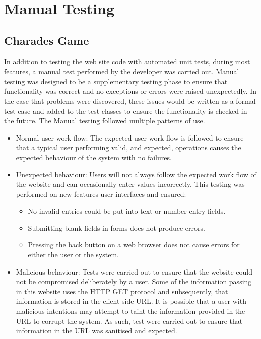 \section{Manual Testing}
\subsection{Charades Game}
In addition to testing the web site code with automated unit tests, during most features, a manual test performed by the developer was carried out. Manual testing was designed to be a supplementary testing phase to ensure that functionality was correct and no exceptions or errors were raised unexpectedly. In the case that problems were discovered, these issues would be written as a formal test case and added to the test classes to ensure the functionality is checked in the future. The Manual testing followed multiple patterns of use.
\begin{itemize}
	\item Normal user work flow: The expected user work flow is followed to ensure that a typical user performing valid, and expected, operations causes the expected behaviour of the system with no failures.
	
	\item Unexpected behaviour: Users will not always follow the expected work flow of the website and can occasionally enter values incorrectly. This testing was performed on new features user interfaces and ensured:
	\begin{itemize}
		\item No invalid entries could be put into text or number entry fields.
		\item Submitting blank fields in forms does not produce errors. 
		\item Pressing the back button on a web browser does not cause errors for either the user or the system.
	\end{itemize}
	
	\item Malicious behaviour: Tests were carried out to ensure that the website could not be compromised deliberately by a user. Some of the information passing in this website uses the HTTP GET protocol and subsequently, that information is stored in the client side URL. It is possible that a user with malicious intentions may attempt to taint the information provided in the URL to corrupt the system. As such, test were carried out to ensure that information in the URL was sanitised and expected.
\end{itemize}


